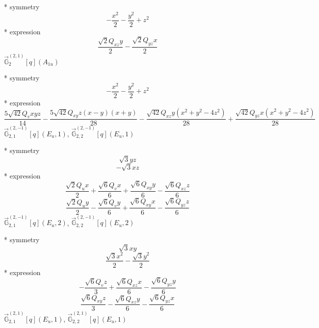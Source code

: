 \documentclass[fleqn,8pt]{jsarticle}
\begin{document}
\noindent\quad ** symmetry
\begin{dmath*}
- \frac{x^{2}}{2} - \frac{y^{2}}{2} + z^{2}
\end{dmath*}
\noindent\quad ** expression
\begin{dmath*}
\frac{\sqrt{2} Q_{xz} y}{2} - \frac{\sqrt{2} Q_{yz} x}{2}
\end{dmath*}
\noindent\quad $\vec{\mathbb{G}}_{2}^{(2,1)}[q](A_{1u})$

\noindent\quad ** symmetry
\begin{dmath*}
- \frac{x^{2}}{2} - \frac{y^{2}}{2} + z^{2}
\end{dmath*}
\noindent\quad ** expression
\begin{dmath*}
\frac{5 \sqrt{42} Q_{v} x y z}{14} - \frac{5 \sqrt{42} Q_{xy} z \left(x - y\right) \left(x + y\right)}{28} - \frac{\sqrt{42} Q_{xz} y \left(x^{2} + y^{2} - 4 z^{2}\right)}{28} + \frac{\sqrt{42} Q_{yz} x \left(x^{2} + y^{2} - 4 z^{2}\right)}{28}
\end{dmath*}
\noindent\quad $\vec{\mathbb{G}}_{2,1}^{(2,-1)}[q](E_{u},1)$, $\vec{\mathbb{G}}_{2,2}^{(2,-1)}[q](E_{u},1)$

\noindent\quad ** symmetry
\begin{dmath*}
\sqrt{3} y z
\end{dmath*}
\begin{dmath*}
- \sqrt{3} x z
\end{dmath*}
\noindent\quad ** expression
\begin{dmath*}
\frac{\sqrt{2} Q_{u} x}{2} + \frac{\sqrt{6} Q_{v} x}{6} + \frac{\sqrt{6} Q_{xy} y}{6} - \frac{\sqrt{6} Q_{xz} z}{6}
\end{dmath*}
\begin{dmath*}
\frac{\sqrt{2} Q_{u} y}{2} - \frac{\sqrt{6} Q_{v} y}{6} + \frac{\sqrt{6} Q_{xy} x}{6} - \frac{\sqrt{6} Q_{yz} z}{6}
\end{dmath*}
\noindent\quad $\vec{\mathbb{G}}_{2,1}^{(2,-1)}[q](E_{u},2)$, $\vec{\mathbb{G}}_{2,2}^{(2,-1)}[q](E_{u},2)$

\noindent\quad ** symmetry
\begin{dmath*}
\sqrt{3} x y
\end{dmath*}
\begin{dmath*}
\frac{\sqrt{3} x^{2}}{2} - \frac{\sqrt{3} y^{2}}{2}
\end{dmath*}
\noindent\quad ** expression
\begin{dmath*}
- \frac{\sqrt{6} Q_{v} z}{3} + \frac{\sqrt{6} Q_{xz} x}{6} - \frac{\sqrt{6} Q_{yz} y}{6}
\end{dmath*}
\begin{dmath*}
\frac{\sqrt{6} Q_{xy} z}{3} - \frac{\sqrt{6} Q_{xz} y}{6} - \frac{\sqrt{6} Q_{yz} x}{6}
\end{dmath*}
\noindent\quad $\vec{\mathbb{G}}_{2,1}^{(2,1)}[q](E_{u},1)$, $\vec{\mathbb{G}}_{2,2}^{(2,1)}[q](E_{u},1)$
\end{document}
